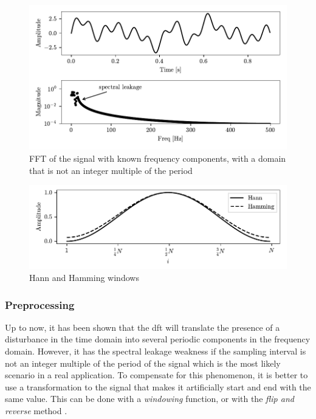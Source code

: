 \begin{figure}
    \centering
    \includegraphics[scale=1]{images/FeatureExtraction/FD_known_outofsync.pdf}
    \caption{FFT of the signal with known frequency components, with a domain that is not an integer multiple of the period}
    \label{fig:FD_known_leackage}
\end{figure}

\begin{figure}
    \centering
    \includegraphics[scale=1]{images/FeatureExtraction/windows.pdf}
    \caption{Hann and Hamming windows}
    \label{fig:windows}
\end{figure} 


\subsubsection{Preprocessing}
Up to now, it has been shown that the \gls{dft} will translate the presence of a disturbance in the time domain into several periodic components in the frequency domain. However, it has the spectral leakage weakness if the sampling interval is not an integer multiple of the period of the signal which is the most likely scenario in a real application. To compensate for this phenomenon, it is better to use a transformation to the signal that makes it artificially start and end with the same value. This can be done with a \emph{windowing} function, or with the \emph{flip and reverse} method \cite{Preprocessing}. 

